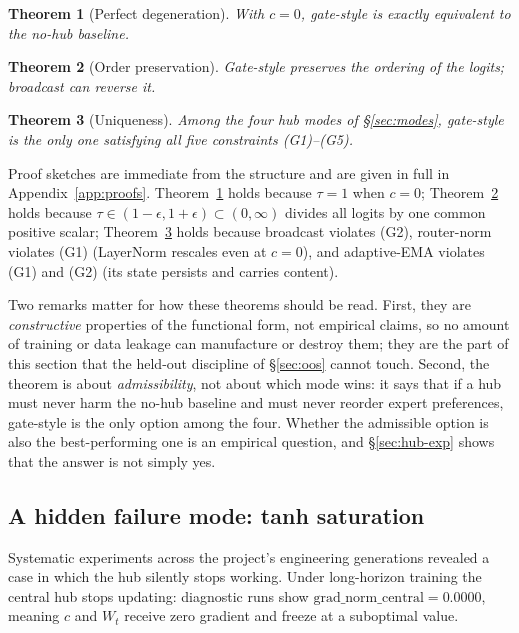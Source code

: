 \documentclass[10pt]{article}
\theoremstyle{definition}
\theoremstyle{plain}
\newtheorem{theorem}{Theorem}[section]
\theoremstyle{remark}
\begin{document}
\begin{theorem}[Perfect degeneration]
\label{thm:deg}
With $c=0$, gate-style is exactly equivalent to the no-hub baseline.
\end{theorem}

\begin{theorem}[Order preservation]
\label{thm:order}
Gate-style preserves the ordering of the logits; broadcast can reverse it.
\end{theorem}

\begin{theorem}[Uniqueness]
\label{thm:uniq}
Among the four hub modes of \S\ref{sec:modes}, gate-style is the only one satisfying all five constraints (G1)--(G5).
\end{theorem}

Proof sketches are immediate from the structure and are given in full in Appendix~\ref{app:proofs}. Theorem~\ref{thm:deg} holds because $\tau = 1$ when $c = 0$; Theorem~\ref{thm:order} holds because $\tau \in (1-\epsilon, 1+\epsilon) \subset (0,\infty)$ divides all logits by one common positive scalar; Theorem~\ref{thm:uniq} holds because broadcast violates (G2), router-norm violates (G1) (LayerNorm rescales even at $c=0$), and adaptive-EMA violates (G1) and (G2) (its state persists and carries content).

Two remarks matter for how these theorems should be read. First, they are \emph{constructive} properties of the functional form, not empirical claims, so no amount of training or data leakage can manufacture or destroy them; they are the part of this section that the held-out discipline of \S\ref{sec:oos} cannot touch. Second, the theorem is about \emph{admissibility}, not about which mode wins: it says that if a hub must never harm the no-hub baseline and must never reorder expert preferences, gate-style is the only option among the four. Whether the admissible option is also the best-performing one is an empirical question, and \S\ref{sec:hub-exp} shows that the answer is not simply yes.

\subsection{A hidden failure mode: tanh saturation}
\label{sec:diagnosis}

Systematic experiments across the project's engineering generations revealed a case in which the hub silently stops working. Under long-horizon training the central hub stops updating: diagnostic runs show $\text{grad\_norm\_central} = 0.0000$, meaning $c$ and $W_t$ receive zero gradient and freeze at a suboptimal value.
\end{document}

